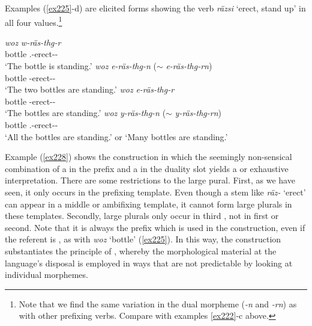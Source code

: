 Examples (\ref{ex225}-d) are elicited forms showing the  verb \emph{räzsi} `erect, stand up' in all four  values.\footnote{Note that we find the same variation in the dual morpheme (\emph{-n} and \emph{-rn}) as with other prefixing verbs. Compare with examples \ref{ex222}-c above.}

\begin{exe}
\ex
\begin{xlist}
	\ex
	\gll \emph{woz} \emph{w-räs-thg-r}\\
	bottle \Tsg.\F-erect-\Stat-\Ndu\\
	\trans `The bottle is standing.'
	\label{ex225}
	\ex
	\gll \emph{woz} \emph{e-räs-thg-n} ($\sim$ \emph{e-räs-thg-rn})\\
	bottle \Stnsg-erect-\Stat-\Du\\
	\trans `The two bottles are standing.'
	\label{ex226}
	\ex
	\gll \emph{woz} \emph{e-räs-thg-r}\\
	bottle \Stnsg-erect-\Stat-\Ndu\\
	\trans `The bottles are standing.'
	\label{ex227}
	\ex
	\gll \emph{woz} \emph{y-räs-thg-n} ($\sim$ \emph{y-räs-thg-rn})\\
	bottle \Tsg.\Masc-erect-\Stat-\Du\\
	\trans `All the bottles are standing.' or `Many bottles are standing.'
	\label{ex228}
\end{xlist}
\end{exe}

Example (\ref{ex228}) shows the  construction in which the seemingly non-sensical combination of a  in the  prefix and a  in the duality slot yields a  or exhaustive  interpretation. There are some restrictions to the large pural. First, as we have seen, it only occurs in the prefixing template. Even though a stem like \emph{räz-} `erect' can appear in a middle or ambifixing template, it cannot form large plurals in these templates. Secondly, large plurals only occur in third , not in first or second. Note that it is always the  prefix which is used in the  construction, even if the referent is , as with \emph{woz} `bottle' (\ref{ex225}). In this way, the  construction substantiates the principle of , whereby the morphological material at the language's disposal is employed in ways that are not predictable by looking at individual morphemes.%


